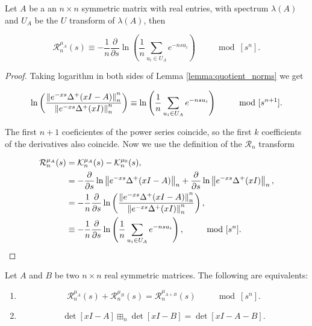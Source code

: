 \begin{corollary} \label{corollary:R_n_as_a_logarithm}
    Let $A$ be a an $n\times n$ symmetric matrix with real entries, with spectrum $\lambda(A)$ and $U_A$ be the $U$ transform of $\lambda(A)$, then 

    \begin{equation*}
        \mathcal R_{n}^{\mu_A}(s) \equiv - \frac1n \frac{\partial}{\partial s} \ln \left(\frac1n \sum_{u_i \in U_A} e^{-nsu_i} \right) \qquad \mod [s^n].
    \end{equation*}
\end{corollary}

\begin{proof}
    Taking logarithm in both sides of Lemma \ref{lemma:quotient_norms} we get 

    \begin{equation*}
        \ln \left( \frac{\left\lVert e^{-xs}\Delta^+(xI - A)\right\rVert_n^n}{\left\lVert e^{-xs}\Delta^+(xI)\right\rVert_n^n} \right) \equiv \ln\left( \frac1n\sum_{u_i \in U_A} e^{-ns u_i} \right) \qquad \mod [s^{n+1}].
    \end{equation*}

    The first $n+1$ coeficientes of the power series coincide, so the first $k$ coefficients of the derivatives also coincide. Now we use the definition of the $\mathcal R_n$ transform

    \begin{align*}
        \mathcal R_{n}^{\mu_A}(s) &= \mathcal K_{n}^{\mu_A}(s) - \mathcal K_n^{\mu_0}(s), \\
        &= - \frac{\partial}{\partial s} \ln \left\lVert e^{-xs}\Delta^+(xI -A) \right\rVert_n + \frac{\partial}{\partial s} \ln \left\lVert e^{-xs}\Delta^+(xI) \right\rVert_n,\\
        &= - \frac1n \frac{\partial}{\partial s} \ln \left( \frac{\left\lVert e^{-xs}\Delta^+(xI -A)\right\rVert_n^n}{ \left\lVert e^{-xs}\Delta^+(xI)\right\rVert_n^n } \right), \\
        &\equiv -\frac1n \frac{\partial}{\partial s} \ln \left( \frac1n \sum_{u_i \in U_A} e^{-nsu_i} \right), \qquad \mod[s^n].
    \end{align*}
\end{proof}

\begin{lemma}
    Let $A$ and $B$ be two $n\times n$ real symmetric matrices. The following are equivalents:

    \begin{enumerate}
        \item \[ \mathcal R_n^{\mu_A}(s) + \mathcal R_n^{\mu_B}(s) = \mathcal R_n^{\mu_{A+B}}(s) \qquad \mod[s^n]. \]
        \item \[ \det[xI - A] \boxplus_n \det[xI-B] = \det[xI - A - B]. \]
    \end{enumerate}
\end{lemma}


